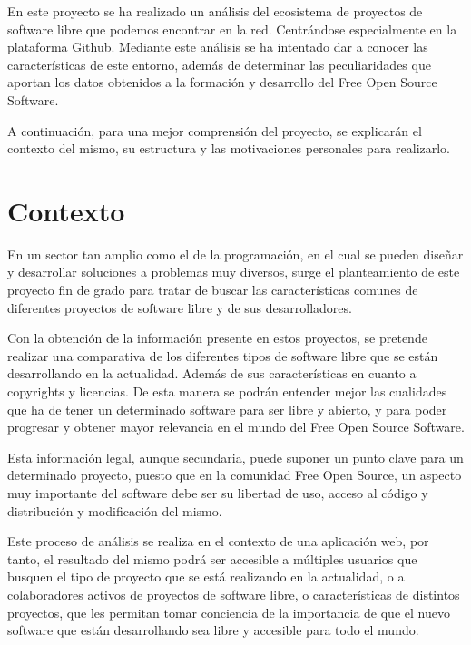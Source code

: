 \documentclass[a4paper, spanish, 12pt]{book}
\begin{document}
En este proyecto se ha realizado un an\'alisis del ecosistema de proyectos de
software libre que podemos encontrar en la red. Centr\'andose especialmente en
la plataforma Github. Mediante este an\'alisis se ha intentado dar a conocer las
caracter\'isticas de este entorno, adem\'as de determinar las peculiaridades que
aportan los datos obtenidos a la formaci\'on y desarrollo del Free Open Source Software.

A continuaci\'on, para una mejor comprensi\'on del proyecto, se explicar\'an el
contexto del mismo, su estructura y las motivaciones personales para realizarlo.

\section{Contexto}
\label{sec:contexto}

En un sector tan amplio como el de la programaci\'on, en el cual se pueden dise\~nar
y desarrollar soluciones a problemas muy diversos, surge el planteamiento de este
proyecto fin de grado para tratar de buscar las caracter\'isticas comunes de
diferentes proyectos de software libre y de sus desarrolladores.

Con la obtenci\'on de la informaci\'on presente en estos proyectos, se pretende
realizar una comparativa de los diferentes tipos de software libre que se est\'an
desarrollando en la actualidad. Adem\'as de sus caracter\'isticas en cuanto a
copyrights y licencias. De esta manera se podr\'an entender mejor las cualidades
que ha de tener un determinado software para ser libre y abierto, y para poder
progresar y obtener mayor relevancia en el mundo del Free Open Source Software.

Esta informaci\'on legal, aunque secundaria, puede suponer un punto clave para
un determinado proyecto, puesto que en la comunidad Free Open Source, un aspecto
muy importante del software debe ser su libertad de uso, acceso al c\'odigo y distribuci\'on
y modificaci\'on del mismo.

Este proceso de an\'alisis se realiza en el contexto de una aplicaci\'on
web, por tanto, el resultado del mismo podr\'a ser accesible a m\'ultiples usuarios
que busquen el tipo de proyecto que se est\'a realizando en la actualidad, o a
colaboradores activos de proyectos de software libre, o caracter\'isticas de distintos
proyectos, que les permitan tomar conciencia de la importancia de que el nuevo software
que est\'an desarrollando sea libre y accesible para todo el mundo.
\end{document}
